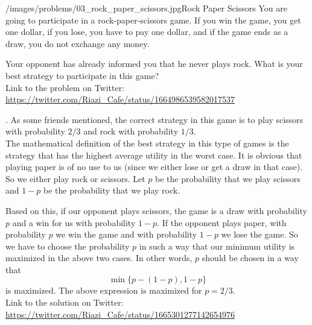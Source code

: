 \begin{problem}{/images/problems/03_rock_paper_scissors.jpg}{Rock Paper Scissors}
    You are going to participate in a rock-paper-scissors game. If you win the game, you get one dollar, if you lose, you have to pay one dollar, and if the game ends as a draw, you do not exchange any money.

Your opponent has already informed you that he never plays rock. What is your best strategy to participate in this game?\\[0.2cm]

Link to the problem on Twitter:  \url{https://twitter.com/Riazi_Cafe/status/1664986539582017537}
\end{problem}
\begin{solution}.
As some friends mentioned, the correct strategy in this game is to play scissors with probability $2/3$ and rock with probability $1/3$.\\[0.2cm]

The mathematical definition of the best strategy in this type of games is the strategy that has the highest average utility in the worst case. It is obvious that playing paper is of no use to us (since we either lose or get a draw in that case). So we either play rock or scissors. Let $p$ be the probability that we play scissors and $1-p$ be the probability that we play rock.

Based on this, if our opponent plays scissors, the game is a draw with probability $p$ and a win for us with probability $1-p$. If the opponent plays paper, with probability $p$ we win the game and with probability $1-p$ we lose the game. So we have to choose the probability $p$ in such a way that our minimum utility is maximized in the above two cases. In other words, $p$ should be chosen in  a way that
$$\min\{p-(1-p), 1-p\}$$
is maximized. The above expression is maximized for $p =  2/3$.\\[0.2cm]

Link to the solution on Twitter:  \url{https://twitter.com/Riazi_Cafe/status/1665301277142654976}
\end{solution}
